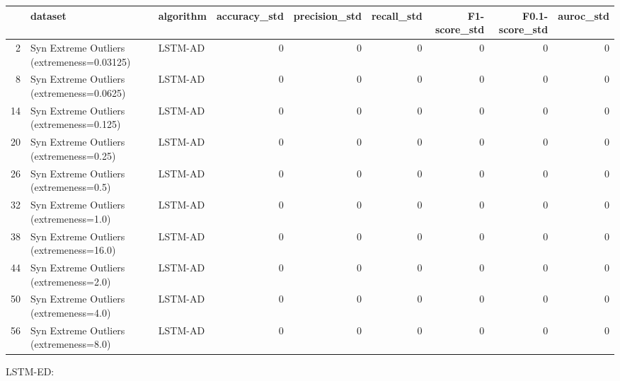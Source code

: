 \begin{tabular}{rllrrrrrr}
\hline
    & dataset                                    & algorithm   &   accuracy\_std &   precision\_std &   recall\_std &   F1-score\_std &   F0.1-score\_std &   auroc\_std \\
\hline
  2 & Syn Extreme Outliers (extremeness=0.03125) & LSTM-AD     &              0 &               0 &            0 &              0 &                0 &           0 \\
  8 & Syn Extreme Outliers (extremeness=0.0625)  & LSTM-AD     &              0 &               0 &            0 &              0 &                0 &           0 \\
 14 & Syn Extreme Outliers (extremeness=0.125)   & LSTM-AD     &              0 &               0 &            0 &              0 &                0 &           0 \\
 20 & Syn Extreme Outliers (extremeness=0.25)    & LSTM-AD     &              0 &               0 &            0 &              0 &                0 &           0 \\
 26 & Syn Extreme Outliers (extremeness=0.5)     & LSTM-AD     &              0 &               0 &            0 &              0 &                0 &           0 \\
 32 & Syn Extreme Outliers (extremeness=1.0)     & LSTM-AD     &              0 &               0 &            0 &              0 &                0 &           0 \\
 38 & Syn Extreme Outliers (extremeness=16.0)    & LSTM-AD     &              0 &               0 &            0 &              0 &                0 &           0 \\
 44 & Syn Extreme Outliers (extremeness=2.0)     & LSTM-AD     &              0 &               0 &            0 &              0 &                0 &           0 \\
 50 & Syn Extreme Outliers (extremeness=4.0)     & LSTM-AD     &              0 &               0 &            0 &              0 &                0 &           0 \\
 56 & Syn Extreme Outliers (extremeness=8.0)     & LSTM-AD     &              0 &               0 &            0 &              0 &                0 &           0 \\
\hline
\end{tabular}

LSTM-ED:

